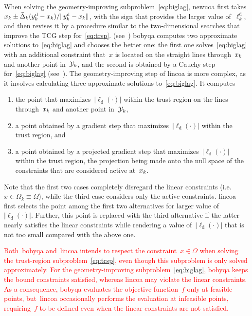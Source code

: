 \documentclass[
    smallextended,  %
    final,        %
]{svjour3}
\newcommand{\abs}[2][]{#1\lvert#2#1\rvert}
\newcommand{\drop}{{\text{d}}}
\newcommand{\fsetm}[1][k]{\Omega_{#1}}
\newcommand{\fset}{\Omega}
\newcommand{\iter}[1][k]{x\ifthenelse{\equal{#1}{}}{}{_{#1}}}
\newcommand{\obj}{f}
\newcommand{\radalt}[1][k]{\bar{\Delta}\ifthenelse{\equal{#1}{}}{}{_{#1}}}
\newcommand{\xpt}[1][k]{\mathcal{Y}\ifthenelse{\equal{#1}{}}{}{_{#1}}}
\newcommand{\red}{\textcolor{red}}
\begin{document}
When solving the geometry-improving subproblem~\eqref{eq:biglag},
\gls{newuoa} first takes $\iter \pm \radalt (y_k^\drop - \iter)/\|y_k^\drop -\iter\|$,
with the sign that provides the larger value of~$\ell_k^\drop$, and then revises it by
a procedure similar to the two-dimensional searches that improve the TCG step for~\eqref{eq:trsp}.
(see~\cite[\S~6]{Powell_2006})
\gls{bobyqa} computes two approximate solutions to~\eqref{eq:biglag} and chooses the better one:
the first one solves~\eqref{eq:biglag} with an additional constraint that~$x$ is located on the
straight lines through~$\iter$ and another point in~$\xpt$, and the second is obtained by a Cauchy
step for~\eqref{eq:biglag} (see~\cite[\S~3]{Powell_2009}).
The geometry-improving step of \gls{lincoa} is more complex, as it involves calculating three
approximate solutions to~\eqref{eq:biglag}.
It computes
\begin{enumerate}
    \item the point that maximizes~$\abs{\ell_{\drop}(\cdot)}$ within the trust region on the lines
        through~$\iter$ and another point in~$\xpt$,
    \item a point obtained by a gradient step that maximizes~$\abs{\ell_{\drop}(\cdot)}$ within the trust region, and
    \item a point obtained by a projected gradient step that maximizes~$\abs{\ell_{\drop}(\cdot)}$ within the trust region, the projection being made onto the null space of the constraints that are considered active at~$\iter$.
\end{enumerate}
Note that the first two cases completely disregard the linear constraints (i.e.~$x\in\fsetm \equiv
\fset$), while the third case
considers only the active constraints.
\gls{lincoa} first selects the point among the first two alternatives for larger value of~$\abs{\ell_{\drop}(\cdot)}$.
Further, this point is replaced with the third alternative if the latter nearly satisfies the linear
constraints while rendering a value of~$\abs{\ell_{\drop}(\cdot)}$ that is not too small compared with the above one.

\red{
Both~\gls{bobyqa} and~\gls{lincoa} intends to respect the constraint~$x\in\fset$ when
solving the trust-region subproblem~\eqref{eq:trsp}, even though this subproblem is only solved
approximately.
For the geometry-improving subproblem~\eqref{eq:biglag}, \gls{bobyqa} keeps the bound constraints
satisfied, whereas \gls{lincoa} may violate the linear constraints.
As a consequence, \gls{bobyqa} evaluates the objective function~$\obj$ only at feasible points,
but~\gls{lincoa} occasionally performs the evaluation at infeasible points, requiring~$\obj$ to be
defined even when the linear constraints are not satisfied.
}
\end{document}
